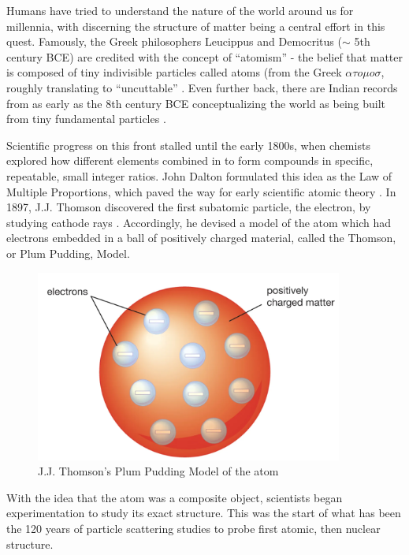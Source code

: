 Humans have tried to understand the nature of the world around us for millennia, with discerning the structure of matter being a central effort in this quest. Famously, the Greek philosophers Leucippus and Democritus ($\sim$ 5th century BCE) are credited with the concept of ``atomism'' - the belief that matter is composed of tiny indivisible particles called atoms (from the Greek $\alpha \tau o \mu o \sigma$, roughly translating to ``uncuttable'' \parencite{Taylor1999Commentary}. Even further back, there are Indian records from as early as the 8th century BCE conceptualizing the world as being built from tiny fundamental particles \parencite{McEvilley2002ThePhilosophies}.

Scientific progress on this front stalled until the early 1800s, when chemists explored how different elements combined in to form compounds in specific, repeatable, small integer ratios. John Dalton formulated this idea as the Law of Multiple Proportions, which paved the way for early scientific atomic theory \parencite{Britannica2010LawProportions}. In 1897, J.J. Thomson discovered the first subatomic particle, the electron, by studying cathode rays \parencite{Thomson1901OnAtoms}. Accordingly, he devised a model of the atom which had electrons embedded in a ball of positively charged material, called the Thomson, or Plum Pudding, Model\parencite{Navarro1995AThomson}.

\begin{figure}
    \centering
    \includegraphics[width=0.9\textwidth]{Chapters/Ch1-Intro/Ch1-Sec1-Background/pics/plumbpudding.png}
    \caption[J.J. Thomson's Plum Pudding Model]{J.J. Thomson's Plum Pudding Model of the atom \parencite{Britannica2023ThomsonModel} }
    \label{fig:PlumPudding}
\end{figure}

With the idea that the atom was a composite object, scientists began experimentation to study its exact structure. This was the start of what has been the 120 years of particle scattering studies to probe first atomic, then nuclear structure. 

